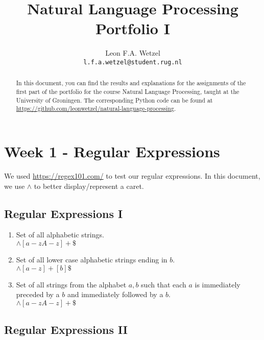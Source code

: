 \documentclass[a4paper, 11pt]{article}
\title{\textbf{Natural Language Processing}\\Portfolio I}
\author{Leon F.A. Wetzel\\ \texttt{l.f.a.wetzel@student.rug.nl}}
\begin{document}
\maketitle

\begin{abstract}
	
	In this document, you can find the results and explanations for the assignments of the first part of the portfolio for the course Natural Language Processing, taught at the University of Groningen. The corresponding Python code can be found at \url{https://github.com/leonwetzel/natural-language-processing}.

\end{abstract}

\section{Week 1 - Regular Expressions}

We used \url{https://regex101.com/} to test our regular expressions. In this document, we use \texttt{$\wedge$} to better display/represent a caret.

\subsection{Regular Expressions I}

\begin{enumerate}
	\item Set of all alphabetic strings. \\ $ \wedge [a-zA-z ]+\$ $
	
	\item Set of all lower case alphabetic strings ending in $b$. \\ $\wedge [a-z ]+[b]\$ $
	
	\item Set of all strings from the alphabet ${a,b}$ such that each $a$ is immediately preceded by a $b$ and immediately followed by a $b$. \\ $ \wedge [a-zA-z ]+\$ $
\end{enumerate}

\subsection{Regular Expressions II}
\end{document}
